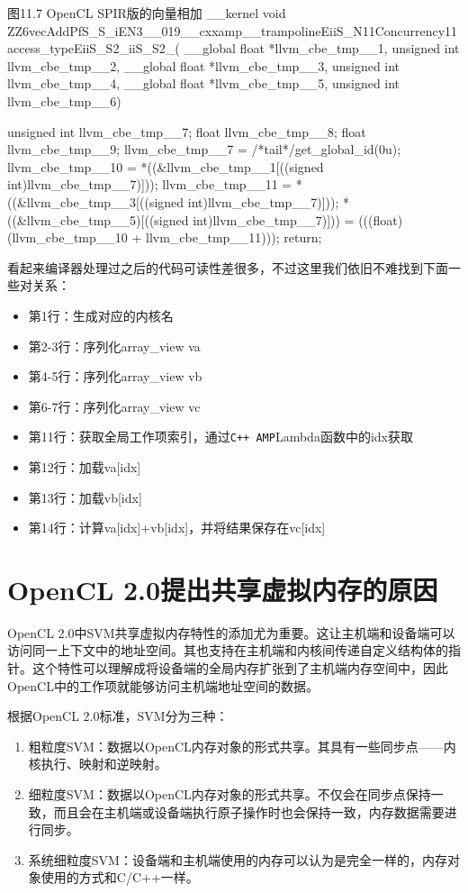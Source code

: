 \begin{codeboxt}[cpp]{图11.7 OpenCL SPIR版的向量相加}
__kernel void
ZZ6vecAddPfS_S_iEN3__019__cxxamp__trampolineEiiS_N11Concurrency11access_typeEiiS_S2_iiS_S2_(
  __global float *llvm_cbe_tmp__1,
  unsigned int llvm_cbe_tmp__2,
  __global float *llvm_cbe_tmp__3,
  unsigned int llvm_cbe_tmp__4,
  __global float *llvm_cbe_tmp__5,
  unsigned int llvm_cbe_tmp__6){

  unsigned int llvm_cbe_tmp__7;
  float llvm_cbe_tmp__8;
  float llvm_cbe_tmp__9;
  llvm_cbe_tmp__7 = /*tail*/get_global_id(0u);
  llvm_cbe_tmp__10 = *((&llvm_cbe_tmp__1[((signed int)llvm_cbe_tmp__7)]));
  llvm_cbe_tmp__11 = *((&llvm_cbe_tmp__3[((signed int)llvm_cbe_tmp__7)]));
  *((&llvm_cbe_tmp__5)[((signed int)llvm_cbe_tmp__7)])) = (((float)(llvm_cbe_tmp__10 + llvm_cbe_tmp__11)));
  return;
}
\end{codeboxt}

看起来编译器处理过之后的代码可读性差很多，不过这里我们依旧不难找到下面一些对关系：

\begin{itemize}
\item 第1行：生成对应的内核名
\item 第2-3行：序列化array\_\allowbreak{}view va
\item 第4-5行：序列化array\_\allowbreak{}view vb
\item 第6-7行：序列化array\_\allowbreak{}view vc
\item 第11行：获取全局工作项索引，通过\texttt{C++ AMP}Lambda函数中的idx获取
\item 第12行：加载va[idx]
\item 第13行：加载vb[idx]
\item 第14行：计算va[idx]+vb[idx]，并将结果保存在vc[idx]
\end{itemize}



\section{OpenCL 2.0提出共享虚拟内存的原因}

OpenCL 2.0中SVM共享虚拟内存特性的添加尤为重要。这让主机端和设备端可以访问同一上下文中的地址空间。其也支持在主机端和内核间传递自定义结构体的指针。这个特性可以理解成将设备端的全局内存扩张到了主机端内存空间中，因此OpenCL中的工作项就能够访问主机端地址空间的数据。

根据OpenCL 2.0标准，SVM分为三种：

\begin{enumerate}
\item 粗粒度SVM：数据以OpenCL内存对象的形式共享。其具有一些同步点——内核执行、映射和逆映射。
\item 细粒度SVM：数据以OpenCL内存对象的形式共享。不仅会在同步点保持一致，而且会在主机端或设备端执行原子操作时也会保持一致，内存数据需要进行同步。
\item 系统细粒度SVM：设备端和主机端使用的内存可以认为是完全一样的，内存对象使用的方式和C/C++一样。
\end{enumerate}

